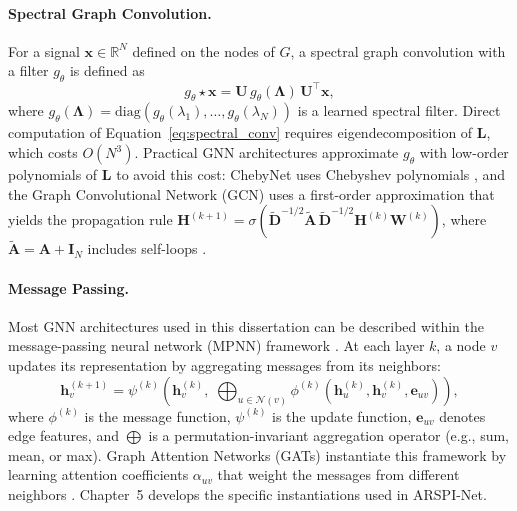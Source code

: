 \paragraph{Spectral Graph Convolution.}
For a signal $\mathbf{x} \in \mathbb{R}^N$ defined on the nodes of $G$, a spectral graph convolution with a filter $g_\theta$ is defined as
\begin{equation}
    g_\theta \star \mathbf{x} = \mathbf{U}\, g_\theta(\boldsymbol{\Lambda})\, \mathbf{U}^\top \mathbf{x},
    \label{eq:spectral_conv}
\end{equation}
where $g_\theta(\boldsymbol{\Lambda}) = \text{diag}(g_\theta(\lambda_1), \ldots, g_\theta(\lambda_N))$ is a learned spectral filter. Direct computation of Equation~\eqref{eq:spectral_conv} requires eigendecomposition of $\mathbf{L}$, which costs $O(N^3)$. Practical GNN architectures approximate $g_\theta$ with low-order polynomials of $\mathbf{L}$ to avoid this cost: ChebyNet uses Chebyshev polynomials \cite{Defferrard2016}, and the Graph Convolutional Network (GCN) uses a first-order approximation that yields the propagation rule $\mathbf{H}^{(k+1)} = \sigma(\tilde{\mathbf{D}}^{-1/2} \tilde{\mathbf{A}}\, \tilde{\mathbf{D}}^{-1/2} \mathbf{H}^{(k)} \mathbf{W}^{(k)})$, where $\tilde{\mathbf{A}} = \mathbf{A} + \mathbf{I}_N$ includes self-loops \cite{Kipf2017}.

\paragraph{Message Passing.}
Most GNN architectures used in this dissertation can be described within the message-passing neural network (MPNN) framework \cite{Gilmer2017}. At each layer $k$, a node $v$ updates its representation by aggregating messages from its neighbors:
\begin{equation}
    \mathbf{h}_v^{(k+1)} = \psi^{(k)}\!\left(\mathbf{h}_v^{(k)},\; \bigoplus_{u \in \mathcal{N}(v)} \phi^{(k)}(\mathbf{h}_u^{(k)}, \mathbf{h}_v^{(k)}, \mathbf{e}_{uv})\right),
    \label{eq:mpnn}
\end{equation}
where $\phi^{(k)}$ is the message function, $\psi^{(k)}$ is the update function, $\mathbf{e}_{uv}$ denotes edge features, and $\bigoplus$ is a permutation-invariant aggregation operator (e.g., sum, mean, or max). Graph Attention Networks (GATs) instantiate this framework by learning attention coefficients $\alpha_{uv}$ that weight the messages from different neighbors \cite{Velickovic2018}. Chapter~5 develops the specific instantiations used in ARSPI-Net.

